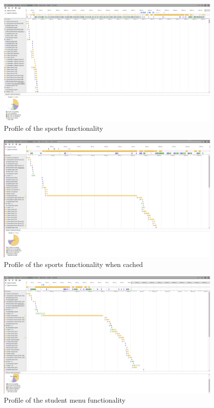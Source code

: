 \documentclass{eplmastersthesis}
\begin{document}
\begin{figure}[H]
\centering
\includegraphics[scale = 0.15]{Images/sports4.png}
\caption{Profile of the sports functionality}
\end{figure}
\begin{figure}[H]
\centering
\includegraphics[scale = 0.15]{Images/sportscached.png}
\caption{Profile of the sports functionality when cached}
\end{figure}
\begin{figure}[H]
\centering
\includegraphics[scale = 0.15]{Images/student.png}
\caption{Profile of the student menu functionality}
\end{figure}



\backcoverpage
\end{document}

